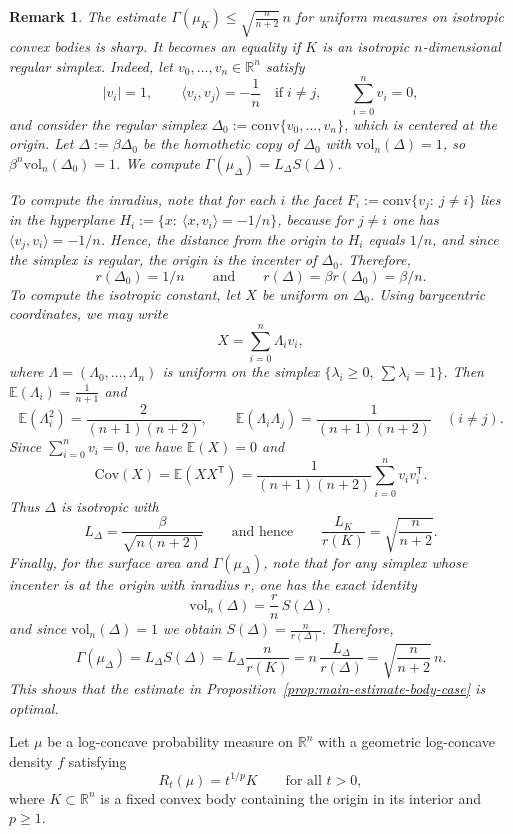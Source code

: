 \documentclass[11pt,leqno]{article}
\newtheorem{remark}[theorem]{Remark}
\theoremstyle{remark}
\numberwithin{equation}{section}
\newcommand{\vol}{\mathrm{vol}}
\newcommand{\ls}{\leqslant}
\newcommand{\gr}{\geqslant}
\begin{document}
\begin{remark}\label{rem:optimal}\rm The estimate $\Gamma(\mu_K)\ls \sqrt{\frac{n}{n+2}}\,n$ 
for uniform measures on isotropic convex bodies is sharp. It becomes an equality if $K$ is an isotropic
$n$-dimensional regular simplex. Indeed, let $v_0,\dots,v_n\in\mathbb{R}^n$ satisfy
$$|v_i|=1,\qquad \langle v_i,v_j\rangle=-\frac1n\quad\text{if}\;i\neq j,\qquad \sum_{i=0}^n v_i=0,$$
and consider the regular simplex $\Delta_0:=\mathrm{conv}\{v_0,\dots,v_n\}$, which is centered at the origin.  
Let $\Delta:=\beta\Delta_0$ be the homothetic copy of $\Delta_0$ with $\vol_n(\Delta)=1$, so $\beta^n\vol_n(\Delta_0)=1$. 
We compute $\Gamma(\mu_\Delta)=L_{\Delta}S(\Delta)$.

To compute the inradius, note that for each $i$ the facet $F_i:=\mathrm{conv}\{v_j:\ j\neq i\}$ lies in the hyperplane
$H_i:=\{x:\ \langle x,v_i\rangle=-1/n\}$, because for $j\neq i$ one has $\langle v_j,v_i\rangle=-1/n$. Hence, the distance from
the origin to $H_i$ equals $1/n$, and since the simplex is regular, the origin is the incenter of $\Delta_0$. Therefore,
$$r(\Delta_0)=1/n\qquad\text{and}\qquad r(\Delta)=\beta r(\Delta_0)=\beta/n.$$
To compute the isotropic constant, let $X$ be uniform on $\Delta_0$. Using barycentric coordinates, we may write
$$X=\sum_{i=0}^n \Lambda_i v_i,$$
where $\Lambda=(\Lambda_0,\dots,\Lambda_n)$ is uniform on the simplex $\{\lambda_i\gr 0,\ \sum \lambda_i=1\}$.
Then $\mathbb{E}(\Lambda_i)=\frac1{n+1}$ and
$$\mathbb{E}(\Lambda_i^2)=\frac{2}{(n+1)(n+2)},\qquad \mathbb{E}(\Lambda_i\Lambda_j)=\frac{1}{(n+1)(n+2)}\quad(i\neq j).$$
Since $\sum_{i=0}^n v_i=0$, we have $\mathbb{E}(X)=0$ and
$$\mathrm{Cov}(X)=\mathbb{E}\left(XX^{\mathsf T}\right)=\frac{1}{(n+1)(n+2)}\sum_{i=0}^n v_i v_i^{\mathsf T}.$$
Thus $\Delta$ is isotropic with
$$L_{\Delta}=\frac{\beta}{\sqrt{n(n+2)}}\qquad\text{and hence}\qquad \frac{L_K}{r(K)}=\sqrt{\frac{n}{n+2}}.$$
Finally, for the surface area and $\Gamma(\mu_\Delta)$, note that for any simplex whose incenter is at the origin with inradius $r$, one has the exact identity
$$\vol_n(\Delta)=\frac{r}{n}\,S(\Delta),$$
and since $\vol_n(\Delta)=1$ we obtain $S(\Delta)=\frac{n}{r(\Delta)}$. Therefore,
$$\Gamma(\mu_\Delta)=L_\Delta S(\Delta)=L_\Delta\frac{n}{r(K)}=n\,\frac{L_\Delta}{r(\Delta)}
= \sqrt{\frac{n}{n+2}}\,n.$$
This shows that the estimate in Proposition~\ref{prop:main-estimate-body-case} is optimal.
\end{remark}

\medskip

Let $\mu$ be a log-concave probability measure on $\mathbb{R}^n$ with a geometric log-concave density $f$ satisfying
\begin{equation}\label{eq:homogeneous}
R_t(\mu)=t^{1/p}K \qquad \text{for all } t>0,
\end{equation}
where $K\subset\mathbb{R}^n$ is a fixed convex body containing the origin in its interior and $p\gr 1$.
\end{document}
